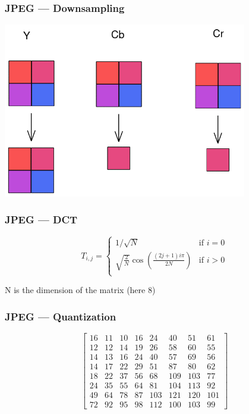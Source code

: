 \documentclass{beamer}
\begin{document}
\begin{frame}
    \frametitle{JPEG — Downsampling}
    \begin{center}
        \includegraphics[width=0.8\textwidth]{downsampling.png}
    \end{center}
\end{frame}

\begin{frame}
    \frametitle{JPEG — DCT}
    $$
        T_{i,j}=\begin{cases}
            1/\sqrt{N}                                    & \text{if } i=0 \\
            \sqrt{\frac{2}{N}}\cos(\frac{(2j+1)i\pi}{2N}) & \text{if } i>0 \\
        \end{cases}
    $$

    N is the dimension of the matrix (here 8)
\end{frame}

\begin{frame}
    \frametitle{JPEG — Quantization}
    $$
        \begin{bmatrix}
            16 & 11 & 10 & 16 & 24  & 40  & 51  & 61  \\
            12 & 12 & 14 & 19 & 26  & 58  & 60  & 55  \\
            14 & 13 & 16 & 24 & 40  & 57  & 69  & 56  \\
            14 & 17 & 22 & 29 & 51  & 87  & 80  & 62  \\
            18 & 22 & 37 & 56 & 68  & 109 & 103 & 77  \\
            24 & 35 & 55 & 64 & 81  & 104 & 113 & 92  \\
            49 & 64 & 78 & 87 & 103 & 121 & 120 & 101 \\
            72 & 92 & 95 & 98 & 112 & 100 & 103 & 99
        \end{bmatrix}
    $$
\end{frame}
\end{document}

